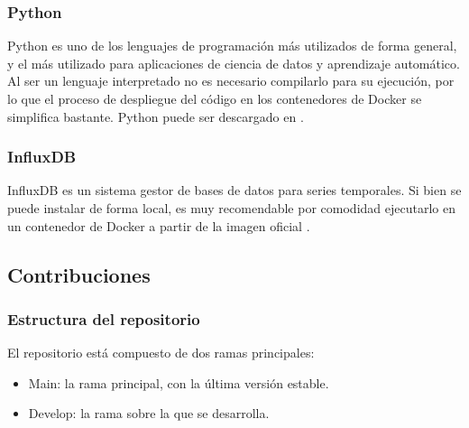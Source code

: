 \subsubsection{Python}

Python es uno de los lenguajes de programación más utilizados de forma general, y el más utilizado para aplicaciones 
de ciencia de datos y aprendizaje automático. Al ser un lenguaje interpretado no es necesario compilarlo para su ejecución, 
por lo que el proceso de despliegue del código en los contenedores de Docker se simplifica bastante.
Python puede ser descargado en \cite{python310}.

\subsubsection{InfluxDB}

InfluxDB es un sistema gestor de bases de datos para series temporales. Si bien se puede instalar de forma local,
es muy recomendable por comodidad ejecutarlo en un contenedor de Docker a partir de la imagen oficial \cite{influx:docker}.

\subsection{Contribuciones}

\subsubsection{Estructura del repositorio}
El repositorio está compuesto de dos ramas principales:
\begin{itemize}
    \item Main: la rama principal, con la última versión estable.
    \item Develop: la rama sobre la que se desarrolla.
\end{itemize}

